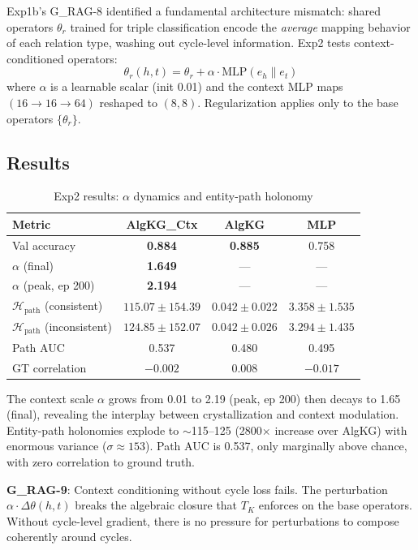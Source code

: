 \documentclass[11pt,letterpaper]{article}
\newcommand{\KH}{\mathcal{H}}
\begin{document}
Exp1b's G\_RAG-8 identified a fundamental architecture mismatch: shared operators $\theta_r$ trained for triple classification encode the \textit{average} mapping behavior of each relation type, washing out cycle-level information. Exp2 tests context-conditioned operators:
\begin{equation}
\theta_r(h, t) = \theta_r + \alpha \cdot \text{MLP}(e_h \| e_t)
\end{equation}
where $\alpha$ is a learnable scalar (init 0.01) and the context MLP maps $(16 \to 16 \to 64)$ reshaped to $(8, 8)$. Regularization applies only to the base operators $\{\theta_r\}$.

\subsection{Results}

\begin{table}[H]
\centering
\caption{Exp2 results: $\alpha$ dynamics and entity-path holonomy}
\begin{tabular}{@{}lccc@{}}
\toprule
\textbf{Metric} & \textbf{AlgKG\_Ctx} & \textbf{AlgKG} & \textbf{MLP} \\
\midrule
Val accuracy & \textbf{0.884} & \textbf{0.885} & 0.758 \\
$\alpha$ (final) & \textbf{1.649} & --- & --- \\
$\alpha$ (peak, ep 200) & \textbf{2.194} & --- & --- \\
$\KH_{\text{path}}$ (consistent) & $115.07 \pm 154.39$ & $0.042 \pm 0.022$ & $3.358 \pm 1.535$ \\
$\KH_{\text{path}}$ (inconsistent) & $124.85 \pm 152.07$ & $0.042 \pm 0.026$ & $3.294 \pm 1.435$ \\
Path AUC & 0.537 & 0.480 & 0.495 \\
GT correlation & $-0.002$ & 0.008 & $-0.017$ \\
\bottomrule
\end{tabular}
\end{table}

The context scale $\alpha$ grows from 0.01 to 2.19 (peak, ep 200) then decays to 1.65 (final), revealing the interplay between crystallization and context modulation. Entity-path holonomies explode to $\sim$115--125 (2800$\times$ increase over AlgKG) with enormous variance ($\sigma \approx 153$). Path AUC is 0.537, only marginally above chance, with zero correlation to ground truth.

\textbf{G\_RAG-9}: Context conditioning without cycle loss fails. The perturbation $\alpha \cdot \Delta\theta(h,t)$ breaks the algebraic closure that $T_K$ enforces on the base operators. Without cycle-level gradient, there is no pressure for perturbations to compose coherently around cycles.
\end{document}
